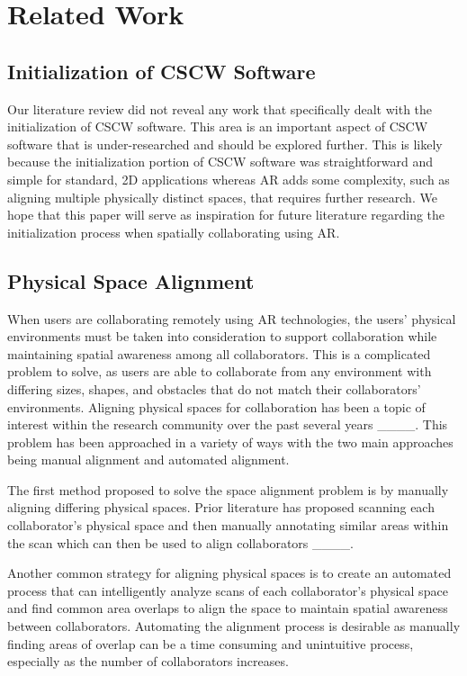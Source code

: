 \section{Related Work}
\subsection{Initialization of CSCW Software}
Our literature review did not reveal any work that specifically dealt with the initialization of CSCW software. This area is an important aspect of CSCW software that is under-researched and should be explored further. This is likely because the initialization portion of CSCW software was straightforward and simple for standard, 2D applications whereas AR adds some complexity, such as aligning multiple physically distinct spaces, that requires further research. We hope that this paper will serve as inspiration for future literature regarding the initialization process when spatially collaborating using AR.  

\subsection{Physical Space Alignment}
When users are collaborating remotely using AR technologies, the users' physical environments must be taken into consideration to support collaboration while maintaining spatial awareness among all collaborators. This is a complicated problem to solve, as users are able to collaborate from any environment with differing sizes, shapes, and obstacles that do not match their collaborators' environments. Aligning physical spaces for collaboration has been a topic of interest within the research community over the past several years ____. This problem has been approached in a variety of ways with the two main approaches being manual alignment and automated alignment. 

The first method proposed to solve the space alignment problem is by manually aligning differing physical spaces. Prior literature has proposed scanning each collaborator's physical space and then manually annotating similar areas within the scan which can then be used to align collaborators ____.

Another common strategy for aligning physical spaces is to create an automated process that can intelligently analyze scans of each collaborator's physical space and find common area overlaps to align the space to maintain spatial awareness between collaborators. Automating the alignment process is desirable as manually finding areas of overlap can be a time consuming and unintuitive process, especially as the number of collaborators increases. 


